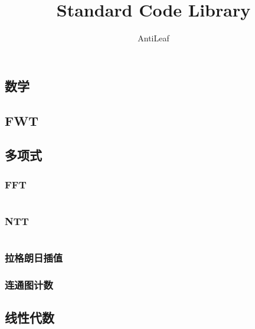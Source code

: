 \documentclass[a4paper, twoside]{article}
\title{Standard Code Library}
\author{AntiLeaf}
\date{}
\begin{document}
	\pagestyle{plain}

	\setcounter{page}{1}

	\begin{multicols}{2}
		
		\begin{spacing}{1}
			\renewcommand{\contentsname}{\huge{目录}}
			\tableofcontents
		\end{spacing}

	\end{multicols}

	\newpage

	\pagestyle{fancy}

	\setcounter{page}{1}

	\begin{multicols}{2}

		\section{数学}
			\subsection{FWT}
				

			\subsection{多项式}
				\subsubsection{FFT}
					\inputminted{cpp}{../src-midori/math/FFT.cpp}
				\subsubsection{NTT}
					\inputminted{cpp}{../src-midori/math/poly.cpp}
				\subsubsection{拉格朗日插值}
					
				\subsubsection{连通图计数}
					
			
			\subsection{线性代数}

\end{multicols}
\end{document}
